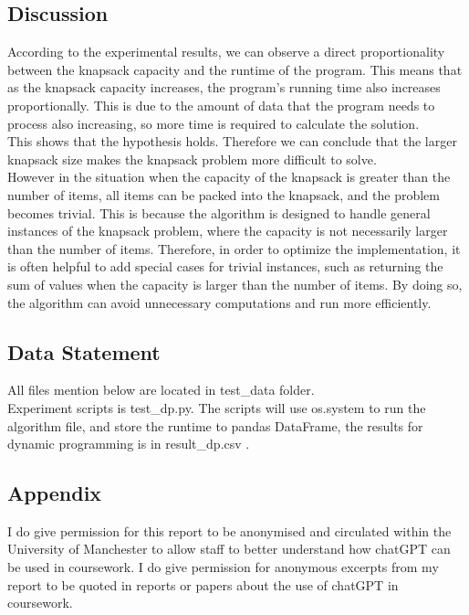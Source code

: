 \documentclass[a4]{article}
\begin{document}
\subsection{Discussion}

According to the experimental results, we can observe a direct proportionality between the knapsack capacity and the runtime of the program. This means that as the knapsack capacity increases, the program's running time also increases proportionally. This is due to the amount of data that the program needs to process also increasing, so more time is required to calculate the solution.\\

\noindent This shows that the hypothesis holds. Therefore we can conclude that the larger knapsack size makes the knapsack problem more difficult to solve.\\

\noindent However in the situation when the capacity of the knapsack is greater than the number of items, all items can be packed into the knapsack, and the problem becomes trivial. This is because the algorithm is designed to handle general instances of the knapsack problem, where the capacity is not necessarily larger than the number of items. Therefore, in order to optimize the implementation, it is often helpful to add special cases for trivial instances, such as returning the sum of values when the capacity is larger than the number of items. By doing so, the algorithm can avoid unnecessary computations and run more efficiently. \\

\subsection{Data Statement}
All files mention below are located in test\_data folder.\\

\noindent Experiment scripts is test\_dp.py. The scripts will use os.system to run the algorithm file, and store the runtime to pandas DataFrame, the results for dynamic programming is in result\_dp.csv .\\

\subsection{Appendix}

I do give permission for this report to be anonymised and circulated within the University of Manchester to allow staff to better understand how chatGPT can be used in coursework.  I do give permission for anonymous excerpts from my report to be quoted in reports or papers about the use of chatGPT in coursework.

\end{document}
